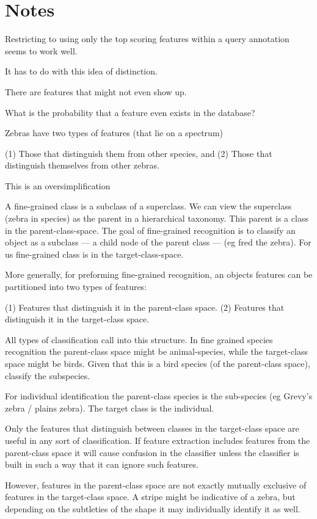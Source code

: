 \section{Notes}

Restricting to using only the top scoring features within a query annotation seems to work well. 

It has to do with this idea of distinction. 

There are features that might not even show up. 

What is the probability that a feature even exists in the database?


Zebras have two types of features (that lie on a spectrum)

(1) Those that distinguish them from other species, and
(2) Those that distinguish themselves from other zebras.

This is an oversimplification

A fine-grained class is a subclass of a superclass.
We can view the superclass (zebra in species) as the parent in a
hierarchical taxonomy.
This parent is a class in the parent-class-space.
The goal of fine-grained recognition is to classify an object as a
subclass --- a child node of the parent class --- (eg fred the zebra).
For us fine-grained class is in the target-class-space.

More generally, for preforming fine-grained recognition, an objects features
can be partitioned into two types of features:

(1) Features that distinguish it in the parent-class space.
(2) Features that distinguish it in the target-class space.

All types of classification call into this structure.
In fine grained species recognition the parent-class space might be
animal-species, while the target-class space might be birds.
Given that this is a bird species (of the parent-class space), classify
the subspecies.

For individual identification the parent-class species is the sub-species
(eg Grevy's zebra / plains zebra).
The target class is the individual.

Only the features that distinguish between classes in the target-class
space are useful in any sort of classification.
If feature extraction includes features from the parent-class space it
will cause confusion in the classifier unless the classifier is built in
such a way that it can ignore such features.


However, features in the parent-class space are not exactly mutually
exclusive of features in the target-class space.
A stripe might be indicative of a zebra, but depending on the subtleties
of the shape it may individually identify it as well.


